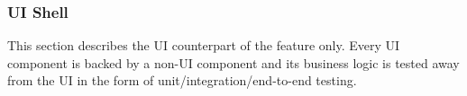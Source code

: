 \documentclass[10pt]{article}
\newcommand{\PriorityTag}[2]{%
    \colorbox{#2!25}{\footnotesize\textsf{\textbf{#1}}}\hspace{0.6em}}
\newcommand{\must}{\leavevmode\PriorityTag{Must}{green}}
\newcounter{reqgrp}[section] %
\newcounter{reqno}
\newcommand{\reqprefix}{GEN}
\newenvironment{requirements}[1]{%
    \renewcommand{\reqprefix}{#1}%
    \refstepcounter{reqgrp}%
    \setcounter{reqno}{0}%
    \begin{enumerate}[leftmargin=*]
    }{\end{enumerate}}
\begin{document}
%
%
%
%
%
%

    \subsubsection{UI Shell}

    This section describes the UI counterpart of the feature only. Every UI component is backed by a non-UI component and its business logic is tested away from the UI in the form of unit/integration/end-to-end testing.
\end{document}
